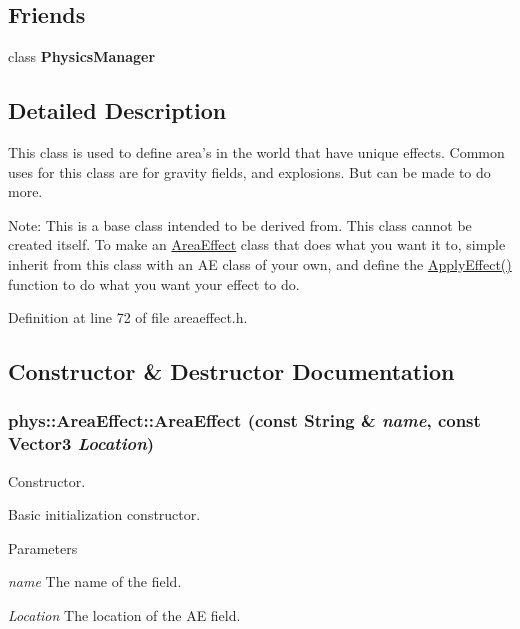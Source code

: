 \subsection*{Friends}
\begin{DoxyCompactItemize}
\item 
\hypertarget{classphys_1_1AreaEffect_a139cf05ac01161b7071c8a037c841683}{
class {\bfseries PhysicsManager}}
\label{d4/d55/classphys_1_1AreaEffect_a139cf05ac01161b7071c8a037c841683}

\end{DoxyCompactItemize}


\subsection{Detailed Description}
This class is used to define area's in the world that have unique effects. Common uses for this class are for gravity fields, and explosions. But can be made to do more. \par
 Note: This is a base class intended to be derived from. This class cannot be created itself. To make an \hyperlink{classphys_1_1AreaEffect}{AreaEffect} class that does what you want it to, simple inherit from this class with an AE class of your own, and define the \hyperlink{classphys_1_1AreaEffect_a3b285ecfcf9c9200662d510e48dd222a}{ApplyEffect()} function to do what you want your effect to do. 

Definition at line 72 of file areaeffect.h.



\subsection{Constructor \& Destructor Documentation}
\hypertarget{classphys_1_1AreaEffect_af4a11385bfc07aea76d135be8a88e136}{
\subsubsection[{AreaEffect}]{\setlength{\rightskip}{0pt plus 5cm}phys::AreaEffect::AreaEffect (const {\bf String} \& {\em name}, \/  const {\bf Vector3} {\em Location})}}
\label{d4/d55/classphys_1_1AreaEffect_af4a11385bfc07aea76d135be8a88e136}


Constructor. 

Basic initialization constructor. 
\begin{DoxyParams}{Parameters}
\item[{\em name}]The name of the field. \item[{\em Location}]The location of the AE field. \end{DoxyParams}


